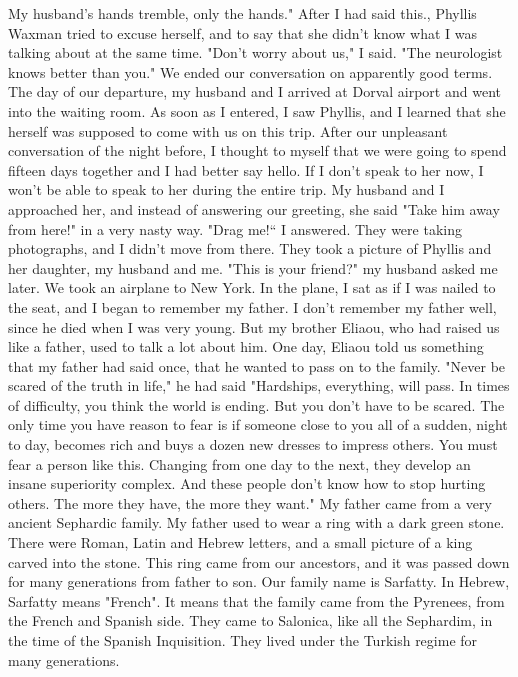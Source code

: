 My husband's hands tremble, only the hands."
After I had said this., Phyllis Waxman tried to excuse herself, and to say that she didn't know what I was talking about at the same time.
"Don't worry about us," I said.
"The neurologist knows better than you."
We ended our conversation on apparently good terms.
The day of our departure, my husband and I arrived at Dorval airport and went into the waiting room.
As soon as I entered, I saw Phyllis, and I learned that she herself was supposed to come with us on this trip.
After our unpleasant conversation of the night before, I thought to myself that we were going to spend fifteen days together and I had better say hello.
If I don't speak to her now, I won't be able to speak to her during the entire trip.
My husband and I approached her, and instead of answering our greeting, she said "Take him away from here!"
in a very nasty way.
"Drag me!“ I answered.
They were taking photographs, and I didn't move from there.
They took a picture of Phyllis and her daughter, my husband and me.
"This is your friend?"
my husband asked me later.
We took an airplane to New York.
In the plane, I sat as if I was nailed to the seat, and I began to remember my father.
I don't remember my father well, since he died when I was very young.
But my brother Eliaou, who had raised us like a father, used to talk a lot about him.
One day, Eliaou told us something that my father had said once, that he wanted to pass on to the family.
"Never be scared of the truth in life," he had said "Hardships, everything, will pass.
In times of difficulty, you think the world is ending.
But you don't have to be scared.
The only  time you have reason to fear is if someone close to you all of a sudden, night to day, becomes rich and buys a dozen new dresses to  impress others.
You must fear a person like this.
Changing from one day to the next, they develop an insane superiority complex.
And these people don't know how to stop hurting others.
The more they have, the more they want."
My father came from a very ancient Sephardic family.
My father used to wear a ring with a dark green stone.
There were Roman, Latin and Hebrew letters, and a small picture of a king carved into the stone.
This ring came from our ancestors, and it was passed down for many generations from father to son.
Our family name is Sarfatty.
In Hebrew, Sarfatty means "French".
It means that the family came from the Pyrenees, from the French and Spanish side.
They came to Salonica, like all the Sephardim, in the time of the Spanish Inquisition.
They lived under the Turkish regime for many generations.

